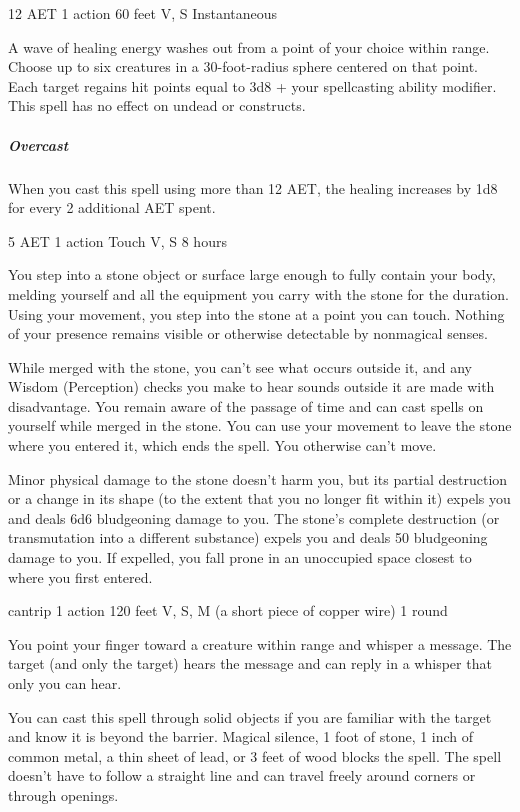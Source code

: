 \label{spell:mass-cure-wounds}
{12 AET}
{1 action}
{60 feet}
{V, S}
{Instantaneous}

A wave of healing energy washes out from a point of your choice within range. Choose up to six creatures in a 30-foot-radius sphere centered on that point. Each target regains hit points equal to 3d8 + your spellcasting ability modifier. This spell has no effect on undead or constructs.
\subparagraph*{Overcast} When you cast this spell using more than 12 AET, the healing increases by 1d8 for every 2 additional AET spent.

\label{spell:meld-into-stone}
{5 AET}
{1 action}
{Touch}
{V, S}
{8 hours}

You step into a stone object or surface large enough to fully contain your body, melding yourself and all the equipment you carry with the stone for the duration. Using your movement, you step into the stone at a point you can touch. Nothing of your presence remains visible or otherwise detectable by nonmagical senses.

While merged with the stone, you can't see what occurs outside it, and any Wisdom (Perception) checks you make to hear sounds outside it are made with disadvantage. You remain aware of the passage of time and can cast spells on yourself while merged in the stone. You can use your movement to leave the stone where you entered it, which ends the spell. You otherwise can't move.

Minor physical damage to the stone doesn't harm you, but its partial destruction or a change in its shape (to the extent that you no longer fit within it) expels you and deals 6d6 bludgeoning damage to you. The stone's complete destruction (or transmutation into a different substance) expels you and deals 50 bludgeoning damage to you. If expelled, you fall prone in an unoccupied space closest to where you first entered.

\label{spell:message}
{cantrip}
{1 action}
{120 feet}
{V, S, M (a short piece of copper wire)}
{1 round}

You point your finger toward a creature within range and whisper a message. The target (and only the target) hears the message and can reply in a whisper that only you can hear.

You can cast this spell through solid objects if you are familiar with the target and know it is beyond the barrier. Magical silence, 1 foot of stone, 1 inch of common metal, a thin sheet of lead, or 3 feet of wood blocks the spell. The spell doesn't have to follow a straight line and can travel freely around corners or through openings.

